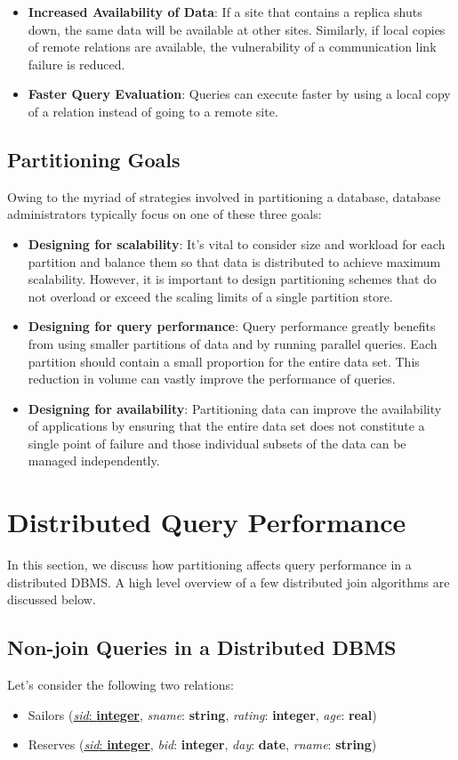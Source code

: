 \begin{itemize}
    \item \textbf{Increased Availability of Data}: If a site that contains a replica shuts down, the same data will be available at other sites. Similarly, if local copies of remote relations are available, the vulnerability of a communication link failure is reduced.
    \item \textbf{Faster Query Evaluation}: Queries can execute faster by using a local copy of a relation instead of going to a remote site.
\end{itemize}

\subsection{Partitioning Goals}
Owing to the myriad of strategies involved in partitioning a database, database administrators typically focus on one of these three goals:

\begin{itemize}
    \item \textbf{Designing for scalability}: It's vital to consider size and workload for each partition and balance them so that data is distributed to achieve maximum scalability. However, it is important to design partitioning schemes that do not overload or exceed the scaling limits of a single partition store. 
    \item \textbf{Designing for query performance}: Query performance greatly benefits from using smaller partitions of data and by running parallel queries. Each partition should contain a small proportion for the entire data set. This reduction in volume can vastly improve the performance of queries.
    \item \textbf{Designing for availability}: Partitioning data can improve the availability of applications by ensuring that the entire data set does not constitute a single point of failure and those individual subsets of the data can be managed independently. 
\end{itemize}

\section{Distributed Query Performance}
In this section, we discuss how partitioning affects query performance in a distributed DBMS. A high level overview of a few distributed join algorithms are discussed below. 

\subsection{Non-join Queries in a Distributed DBMS}
Let's consider the following two relations:
\begin{itemize}
    \item Sailors (\underline{\textit{sid}: \textbf{integer}}, \textit{sname}: \textbf{string}, \textit{rating}: \textbf{integer}, \textit{age}: \textbf{real})
    \item Reserves (\underline{\textit{sid}: \textbf{integer}}, \textit{bid}: \textbf{integer}, \textit{day}: \textbf{date}, \textit{rname}: \textbf{string})
\end{itemize}

